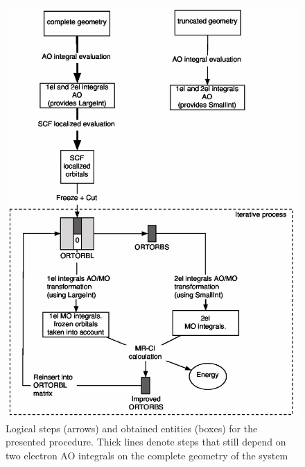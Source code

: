\begin{figure}[h!]
\begin{center}
\includegraphics[width=13cm,keepaspectratio]{02_localization/images/logical-scheme-gimped.eps}
\caption{\footnotesize Logical steps (arrows) and obtained entities (boxes) for the
presented procedure. Thick lines denote steps that still depend on two
electron AO integrals on the complete geometry of the system
} \label{fig:logical-scheme}
\end{center}
\end{figure}
